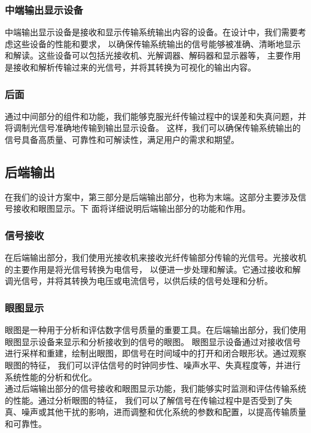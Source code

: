 \documentclass[12pt, a4paper, oneside]{article}
\begin{document}
\begin{spacing}{2.0}
\subsubsection*{中端输出显示设备}
中端输出显示设备是接收和显示传输系统输出内容的设备。在设计中，我们需要考虑这些设备的性能和要求，
以确保传输系统输出的信号能够被准确、清晰地显示和解读。这些设备可以包括光接收机、光解调器、解码器和显示器等，
主要作用是接收和解析传输过来的光信号，并将其转换为可视化的输出内容。
\subsubsection*{后面}
通过中间部分的组件和功能，我们能够克服光纤传输过程中的误差和失真问题，并将调制光信号准确地传输到输出显示设备。
这样，我们可以确保传输系统输出的信号具备高质量、可靠性和可解读性，满足用户的需求和期望。
\subsection{后端输出}
在我们的设计方案中，第三部分是后端输出部分，也称为末端。这部分主要涉及信号接收和眼图显示。下
面将详细说明后端输出部分的功能和作用。
\subsubsection*{信号接收}
在后端输出部分，我们使用光接收机来接收光纤传输部分传输的光信号。光接收机的主要作用是将光信号转换为电信号，
以便进一步处理和解读。它通过接收和解调光信号，并将其转换为电压或电流信号，以供后续的信号处理和分析。
\subsubsection*{眼图显示}
眼图是一种用于分析和评估数字信号质量的重要工具。在后端输出部分，我们使用眼图显示设备来显示和分析接收到的信号的眼图。
眼图显示设备通过对接收信号进行采样和重建，绘制出眼图，即信号在时间域中的打开和闭合眼形状。通过观察眼图的特征，
我们可以评估信号的时钟同步性、噪声水平、失真程度等，并进行系统性能的分析和优化。
\\
通过后端输出部分的信号接收和眼图显示功能，我们能够实时监测和评估传输系统的性能。通过分析眼图的特征，
我们可以了解信号在传输过程中是否受到了失真、噪声或其他干扰的影响，进而调整和优化系统的参数和配置，以提高传输质量和可靠性。
\\


\end{spacing}
\end{document}
